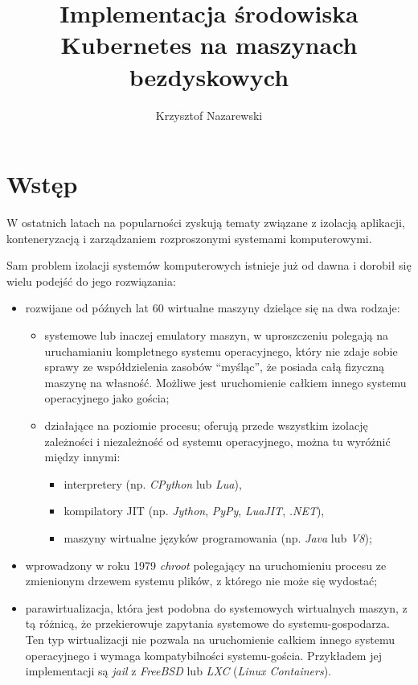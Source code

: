 \documentclass[a4paper,12pt,twoside,openany]{report}
\title{Implementacja środowiska Kubernetes na maszynach bezdyskowych}
\author{Krzysztof Nazarewski}
\providecommand{\tightlist}{%
  \setlength{\itemsep}{0pt}\setlength{\parskip}{0pt}}
\begin{document}
\maketitle
\hypertarget{wstux119p}{%
\chapter{Wstęp}\label{wstux119p}}

W ostatnich latach na popularności zyskują tematy związane z izolacją
aplikacji, konteneryzacją i zarządzaniem rozproszonymi systemami
komputerowymi.

Sam problem izolacji systemów komputerowych istnieje już od dawna i
dorobił się wielu podejść do jego rozwiązania:

\begin{itemize}
\item
  rozwijane od późnych lat 60 wirtualne maszyny dzielące się na dwa
  rodzaje:

  \begin{itemize}
  \item
    systemowe lub inaczej emulatory maszyn, w uproszczeniu polegają na
    uruchamianiu kompletnego systemu operacyjnego, który nie zdaje sobie
    sprawy ze współdzielenia zasobów ``myśląc'', że posiada całą
    fizyczną maszynę na własność. Możliwe jest uruchomienie całkiem
    innego systemu operacyjnego jako gościa;
  \item
    działające na poziomie procesu; oferują przede wszystkim izolację
    zależności i niezależność od systemu operacyjnego, można tu wyróżnić
    między innymi:

    \begin{itemize}
    \tightlist
    \item
      interpretery (np. \emph{CPython} lub \emph{Lua}),
    \item
      kompilatory JIT (np. \emph{Jython}, \emph{PyPy}, \emph{LuaJIT},
      \emph{.NET}),
    \item
      maszyny wirtualne języków programowania (np. \emph{Java} lub
      \emph{V8});
    \end{itemize}
  \end{itemize}
\item
  wprowadzony w roku 1979 \emph{chroot} polegający na uruchomieniu
  procesu ze zmienionym drzewem systemu plików, z którego nie może się
  wydostać;
\item
  parawirtualizacja, która jest podobna do systemowych wirtualnych
  maszyn, z tą różnicą, że przekierowuje zapytania systemowe do
  systemu-gospodarza. Ten typ wirtualizacji nie pozwala na uruchomienie
  całkiem innego systemu operacyjnego i wymaga kompatybilności
  systemu-gościa. Przykładem jej implementacji są \emph{jail} z
  \emph{FreeBSD} lub \emph{LXC} (\emph{Linux Containers}).
\end{itemize}
\end{document}
